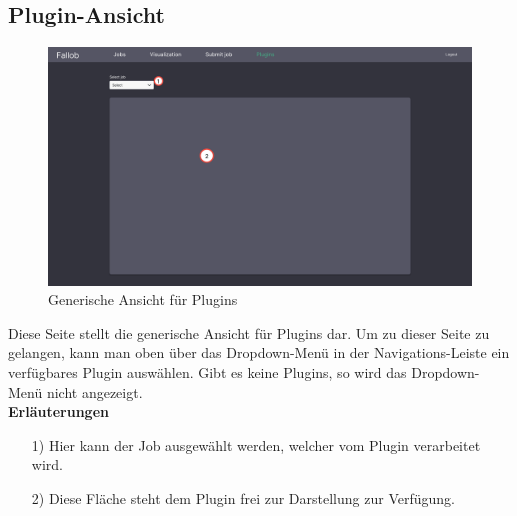 
\subsection{Plugin-Ansicht}
\label{pages:plugin}
\begin{figure}[H]
    \centering
    \includegraphics[width=\textwidth]{images-interface/v4_interface/plugin_page_4.pdf}
    \caption{Generische Ansicht für Plugins}
    \label{fig:plugin-page}
\end{figure}
Diese Seite stellt die generische Ansicht für Plugins dar. Um zu dieser Seite zu gelangen, kann man oben über das Dropdown-Menü in der Navigations-Leiste ein verfügbares Plugin auswählen. Gibt es keine Plugins, so wird das Dropdown-Menü nicht angezeigt. \\

\textbf{Erläuterungen}
\begin{itemize}
    \item[1)] Hier kann der Job ausgewählt werden, welcher vom Plugin verarbeitet wird.
    \item[2)] Diese Fläche steht dem Plugin frei zur Darstellung zur Verfügung.
\end{itemize}

\newpage
